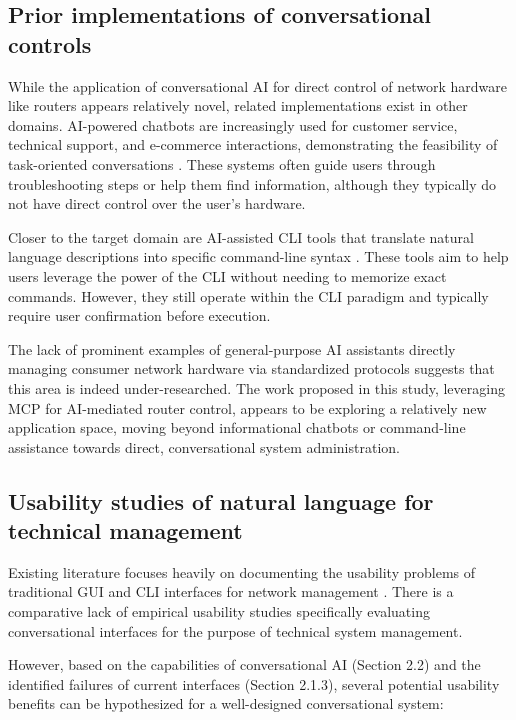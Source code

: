 \subsection{Prior implementations of conversational controls}
While the application of conversational AI for direct control of network hardware like routers appears relatively novel, related implementations exist in other domains. AI-powered chatbots are increasingly used for customer service, technical support, and e-commerce interactions, demonstrating the feasibility of task-oriented conversations \cite{parental_controls_value}. These systems often guide users through troubleshooting steps or help them find information, although they typically do not have direct control over the user's hardware.

Closer to the target domain are AI-assisted CLI tools that translate natural language descriptions into specific command-line syntax \cite{nlp_cybersecurity}. These tools aim to help users leverage the power of the CLI without needing to memorize exact commands. However, they still operate within the CLI paradigm and typically require user confirmation before execution.

The lack of prominent examples of general-purpose AI assistants directly managing consumer network hardware via standardized protocols suggests that this area is indeed under-researched. The work proposed in this study, leveraging MCP for AI-mediated router control, appears to be exploring a relatively new application space, moving beyond informational chatbots or command-line assistance towards direct, conversational system administration.

\subsection{Usability studies of natural language for technical management}
Existing literature focuses heavily on documenting the usability problems of traditional GUI and CLI interfaces for network management \cite{home_network_challenges}. There is a comparative lack of empirical usability studies specifically evaluating conversational interfaces for the purpose of technical system management.

However, based on the capabilities of conversational AI (Section 2.2) and the identified failures of current interfaces (Section 2.1.3), several potential usability benefits can be hypothesized for a well-designed conversational system:

